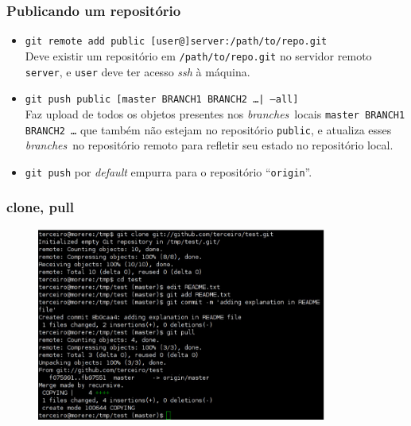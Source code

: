 \documentclass{beamer}
\newcommand{\branches}{\emph{branches}}
\begin{document}
\begin{frame}
  \frametitle{Publicando um repositório}
  \pause
  \begin{itemize}
    \item \texttt{git remote add public [user@]server:/path/to/repo.git}
      \\
      Deve existir um repositório em \texttt{/path/to/repo.git} no
      servidor remoto \texttt{server}, e \texttt{user} deve ter acesso
      \emph{ssh} à máquina.
      \pause

    \item \texttt{git push public [master BRANCH1 BRANCH2 \ldots| --all]}
      \\
      Faz upload de todos os objetos presentes nos \branches\ locais
      \texttt{master BRANCH1 BRANCH2 \ldots} que também não estejam no
      repositório \texttt{public}, e atualiza esses \branches\ no
      repositório remoto para refletir seu estado no repositório local.
      \pause

    \item \texttt{git push} por \emph{default} empurra para o
      repositório ``\texttt{origin}''. 
  \end{itemize}
\end{frame}

\begin{frame}
  \frametitle{clone, pull}
  \begin{figure}[h]
    \begin{center}
      \includegraphics[width=0.85\textwidth]{figs/git-screenshot-clone-pull.pdf}
    \end{center}
    \label{fig:git-clone-pull}
  \end{figure}
\end{frame}
\end{document}
